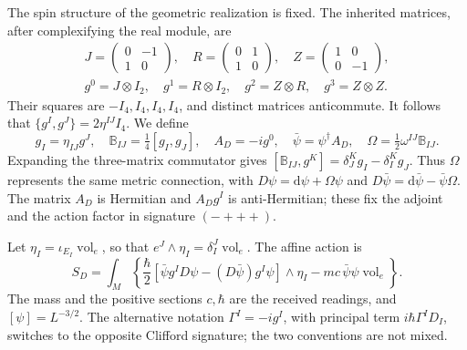 The spin structure of the geometric realization is fixed. The inherited matrices, after complexifying the real module, are
\begin{equation}
 \begin{gathered}
 J=\begin{pmatrix}0&-1\\1&0\end{pmatrix},\quad
 R=\begin{pmatrix}0&1\\1&0\end{pmatrix},\quad
 Z=\begin{pmatrix}1&0\\0&-1\end{pmatrix},\\
 g^0=J\otimes I_2,\quad g^1=R\otimes I_2,\quad
 g^2=Z\otimes R,\quad g^3=Z\otimes Z .
 \end{gathered}
 \label{hmtcuatro:ant:clifford}
\end{equation}
Their squares are \(-I_4,I_4,I_4,I_4\), and distinct matrices anticommute. It follows that \(\{g^I,g^J\}=2\eta^{IJ}I_4\). We define
\[
 g_I=\eta_{IJ}g^J,\quad
 \mathbb B_{IJ}=\tfrac14[g_I,g_J],\quad
 A_D=-ig^0,\quad \bar\psi=\psi^\dagger A_D,\quad
 \Omega=\tfrac12\omega^{IJ}\mathbb B_{IJ}.
\]
Expanding the three-matrix commutator gives \([\mathbb B_{IJ},g^K]=\delta_J^Kg_I-\delta_I^Kg_J\). Thus \(\Omega\) represents the same metric connection, with \(D\psi=\mathrm d\psi+\Omega\psi\) and \(D\bar\psi=\mathrm d\bar\psi-\bar\psi\Omega\). The matrix \(A_D\) is Hermitian and \(A_Dg^I\) is anti-Hermitian; these fix the adjoint and the action factor in signature \((-+++)\).

Let \(\eta_I=\iota_{E_I}\operatorname{vol}_e\), so that \(e^J\wedge\eta_I=\delta_I^J\operatorname{vol}_e\). The affine action is
\begin{equation}
 S_D=\int_M\left\{
 \frac{\hbar}{2}
 [\bar\psi g^ID\psi-(D\bar\psi)g^I\psi]\wedge\eta_I
 -mc\,\bar\psi\psi\operatorname{vol}_e\right\}.
 \label{hmtcuatro:ant:accion-dirac}
\end{equation}
The mass and the positive sections \(c,\hbar\) are the received readings, and \([\psi]=L^{-3/2}\). The alternative notation \(\Gamma^I=-ig^I\), with principal term \(i\hbar\Gamma^ID_I\), switches to the opposite Clifford signature; the two conventions are not mixed.


